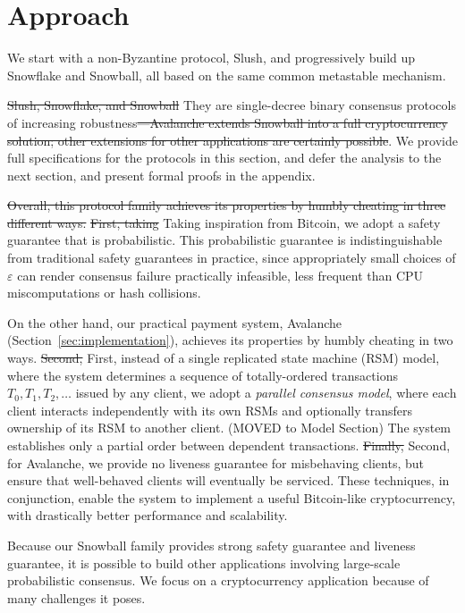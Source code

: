 \documentclass[letterpaper,twocolumn,10pt]{article}
\newcommand{\tronly}[2]{#1}
\newcommand{\editremove}[1]{{\color{red}\sout{#1}}}
\newcommand{\editinsert}[1]{{\color{blue}#1}}
\newcommand{\editchange}[1]{{\color{orange}#1}}
\theoremstyle{definition}
\newcommand{\Jon}[1]{{\color{blue} \textbf{Jon: } #1}}
\begin{document}
\section{Approach}\tronly{}{\vspace{-0.5em}}
\label{sec:approach}
We start with a non-Byzantine protocol, Slush, and progressively build up \editchange{Snowflake and Snowball}, all based on the same common metastable mechanism.
\tronly{
\editremove{Slush, Snowflake, and Snowball} \editinsert{They} are single-decree binary consensus protocols
of increasing robustness\editremove{---Avalanche extends Snowball into a full
cryptocurrency solution; other extensions for other applications are certainly
possible}.
We provide full specifications for the protocols in this section, and defer the analysis to the next section, and present formal
proofs in the appendix.
}{}

\editremove{Overall, this protocol family achieves its properties by humbly cheating in three different ways.}
\editremove{First, taking} \editinsert{Taking} inspiration from Bitcoin, we adopt a safety guarantee that is probabilistic.
\tronly{This probabilistic guarantee is indistinguishable from traditional safety guarantees in practice, since appropriately small choices of $\varepsilon$ can render consensus failure practically infeasible, less frequent than CPU miscomputations or hash collisions.}{}

\editinsert{On the other hand, our practical payment system, Avalanche (Section~\ref{sec:implementation}), achieves its
properties by humbly cheating in two ways.}
\editremove{Second, }\editinsert{First, }instead of a single replicated state machine (RSM) model, where the system determines a sequence of totally-ordered transactions $T_0, T_1, T_2, \ldots$ issued by any client, we adopt a \emph{parallel consensus model}, where each client interacts independently with its own RSMs and optionally transfers ownership of its RSM to another client. (MOVED to Model Section) The system establishes only a partial order between dependent transactions.
\editremove{Finally, }\editinsert{Second, }for Avalanche, we provide no liveness guarantee for misbehaving clients, but ensure that well-behaved clients will eventually be serviced.
These techniques, in conjunction, enable the system to implement a useful Bitcoin-like cryptocurrency, with drastically better performance and scalability.

\editchange{Because our Snowball family provides strong safety guarantee and liveness guarantee},
it is possible to build other applications involving large-scale probabilistic consensus. We focus on a cryptocurrency application because of many challenges it poses.
\end{document}
